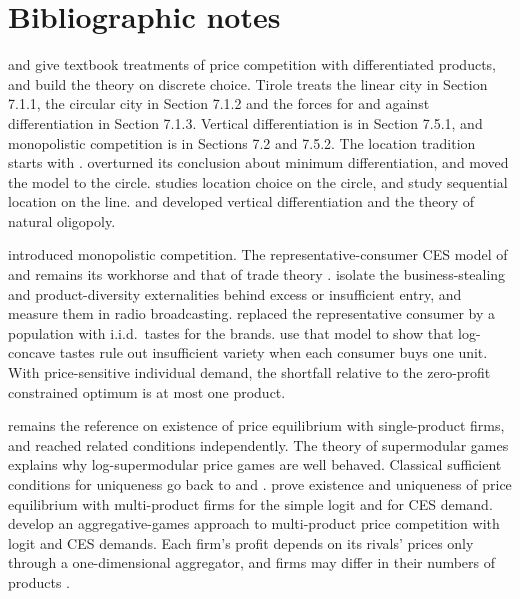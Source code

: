 \section{Bibliographic notes}\label{sec:04-notes}

\citet[ch.~7]{Tirole1988} and \citet{Vives1999} give textbook treatments of price competition with differentiated
products, and \citet{AndersonDePalmaThisse1992} build the theory on discrete choice. Tirole treats the linear city in
Section 7.1.1, the circular city in Section 7.1.2 and the forces for and against differentiation in Section 7.1.3.
Vertical differentiation is in Section 7.5.1, and monopolistic competition is in Sections 7.2 and 7.5.2. The location
tradition starts with \citet{Hotelling1929}. \citet{DAspremontGabszewiczThisse1979} overturned its conclusion about
minimum differentiation, and \citet{Salop1979} moved the model to the circle. \citet{Economides1989} studies location
choice on the circle, and \citet{PrescottVisscher1977} study sequential location on the line.
\citet{GabszewiczThisse1979} and \citet{ShakedSutton1982,ShakedSutton1983} developed vertical differentiation and the
theory of natural oligopoly.

\citet{Chamberlin1933} introduced monopolistic competition. The representative-consumer CES model of
\citet{Spence1976} and \citet{DixitStiglitz1977} remains its workhorse and that of trade theory
\citep{Krugman1980,Melitz2003}. \citet{MankiwWhinston1986} isolate the business-stealing and product-diversity
externalities behind excess or insufficient entry, and \citet{BerryWaldfogel1999} measure them in radio
broadcasting. \citet{PerloffSalop1985} replaced the representative consumer by a population with i.i.d.\ tastes for
the brands. \citet{AndersonDePalmaNesterov1995} use that model to show that log-concave tastes rule out
insufficient variety when each consumer buys one unit. With price-sensitive individual demand, the shortfall relative
to the zero-profit constrained optimum is at most one product.

\citet{CaplinNalebuff1991} remains the reference on existence of price equilibrium with single-product firms, and
\citet{Dierker1989} reached related conditions independently. The theory of supermodular games
\citep{MilgromRoberts1990,Vives1990} explains why log-supermodular price games are well behaved. Classical sufficient
conditions for uniqueness go back to \citet{Friedman1977} and \citet{GaleNikaido1965}.
\citet[Theorems~7 and~13]{KonovalovSandor2010} prove existence and uniqueness of price equilibrium with multi-product
firms for the simple logit and for CES demand.
\citet{NockeSchutz2018} develop an aggregative-games approach to multi-product price competition with logit and CES
demands. Each firm's profit depends on its rivals' prices only through a one-dimensional aggregator, and firms may
differ in their numbers of products \citep[p.~229, n.~127, and p.~232, n.~140]{AskerNocke2021}.

